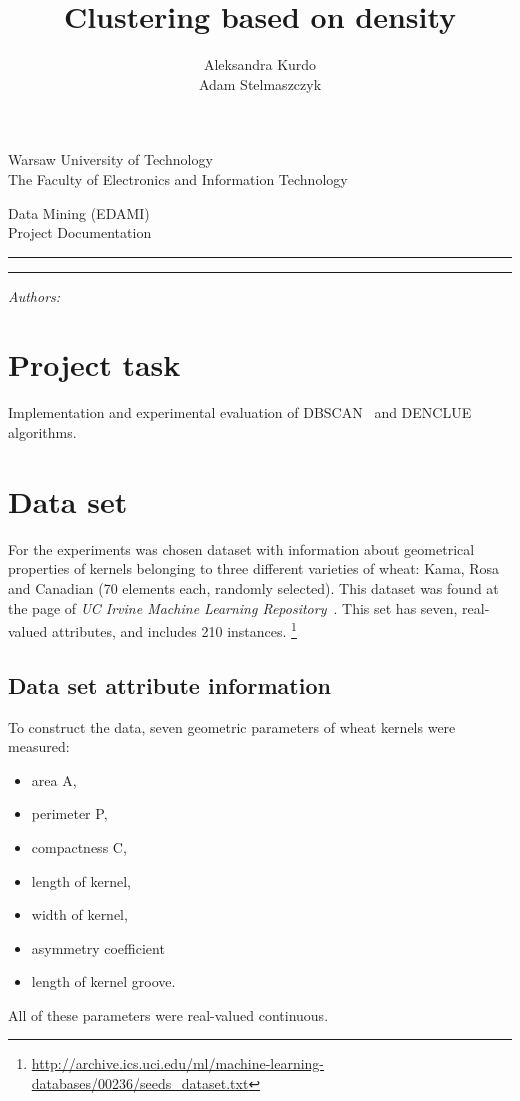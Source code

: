 \documentclass[12pt, a4paper, notitlepage, oneside]{article}
\title{Clustering based on density}
\author{Aleksandra Kurdo\\ Adam Stelmaszczyk}
\makeatletter
\newcommand{\linia}{\rule{\linewidth}{0.4mm}}
\renewcommand{\maketitle}{
\begin{titlepage}

    \vspace*{1cm}

    \begin{center}\small

    Warsaw University of Technology\\
    The Faculty of Electronics and Information Technology\\

    \end{center}

    \vspace{3cm}

     \begin{center}

    Data Mining (EDAMI)\\ Project Documentation

    \end{center}

    \noindent\linia

    \begin{center}

      \LARGE \textsc{\@title}

         \end{center}

     \noindent\linia

    \vspace{0.5cm}

    \begin{flushright}

    \begin{minipage}{5cm}

    \textit{\small Authors:}\\

    \normalsize \textsc{\@author} \par

    \end{minipage}

    \vspace{4cm}
    
 

     \end{flushright}

    \vspace*{\stretch{6}}

    \begin{center}

    \@date

    \end{center}

  \end{titlepage}
}
\makeatother
\begin{document}
\maketitle


\onehalfspacing


\section*{Project task}
Implementation and experimental evaluation of DBSCAN~\cite{dbscan} and DENCLUE~\cite{denclue} algorithms. 


\section*{Data set}

For the experiments was chosen dataset with information about geometrical properties of kernels belonging to three different varieties of wheat: Kama, Rosa and Canadian (70 elements each, randomly selected). This dataset was found at the page of \textit{UC Irvine Machine Learning Repository}~\cite{dataset}. This set has seven, real-valued attributes, and includes 210 instances. \footnote{\url{http://archive.ics.uci.edu/ml/machine-learning-databases/00236/seeds_dataset.txt}}

\subsection*{Data set attribute information}


To construct the data, seven geometric parameters of wheat kernels were measured: 

\begin{itemize}
	\item area A, 
	\item perimeter P, 
	\item compactness C, 
	\item length of kernel, 
	\item width of kernel, 
	\item asymmetry coefficient 
	\item length of kernel groove. 
\end{itemize}

All of these parameters were real-valued continuous.
\end{document}
